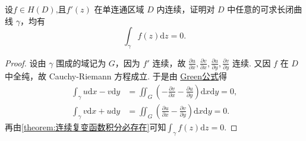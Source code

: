 \documentclass[../../main.tex]{subfiles}%
\begin{document}
\begin{example}
设$f\in H(D)$,且\(f'(z)\) 在单连通区域 \(D\) 内连续，证明对 \( D \) 中任意的可求长闭曲线 \( \gamma \)，均有
\[
\int_\gamma f(z)\mathrm{d}z = 0.
\]
\end{example}
\begin{proof}
设由 \(\gamma\) 围成的域记为 \(G\)，因为 \(f'\) 连续，故 \(\frac{\partial u}{\partial x}, \frac{\partial v}{\partial x}, \frac{\partial u}{\partial y}, \frac{\partial v}{\partial y}\) 连续.
又因 \(f\) 在 \(D\) 中全纯，故 Cauchy-Riemann 方程成立. 于是由 \hyperref[Basis of Analytics-theorem:Green公式--数分]{Green公式}得
\begin{align*}
\int_{\gamma} u \mathrm{d}x - v \mathrm{d}y &= \iint_{G} \left(-\frac{\partial v}{\partial x} - \frac{\partial u}{\partial y}\right) \mathrm{d}x \mathrm{d}y = 0, \\
\int_{\gamma} v \mathrm{d}x + u \mathrm{d}y &= \iint_{G} \left(\frac{\partial u}{\partial x} - \frac{\partial v}{\partial y}\right) \mathrm{d}x \mathrm{d}y = 0.
\end{align*}
再由\cref{theorem:连续复变函数积分必存在}可知\(\int_{\gamma} f(z) \mathrm{d}z = 0.\)
\end{proof}
\end{document}
